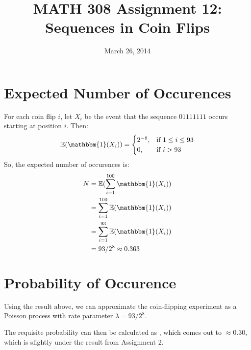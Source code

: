 \documentclass[twocolumn]{article}
\title{MATH 308 Assignment 12:\\Sequences in Coin Flips}
\date{March 26, 2014}
\begin{document}
\maketitle

\section{Expected Number of Occurences}
For each coin flip $i$, let $X_i$ be the event that the sequence $01111111$ occurs starting at position $i$. Then:\[
\ev{\mathbbm{1}(X_i)}=\begin{cases}
	2^{-8},& \text{if } 1 \le i \le 93 \\
	0,& \text{if } i>93
\end{cases}
\]
So, the expected number of occurences is:\begin{align*}
N	&= \ev{\sum_{i=1}^{100} \mathbbm{1}(X_i)}\\
	&= \sum_{i=1}^{100} \ev{\mathbbm{1}(X_i)}\\
	&= \sum_{i=1}^{93} \ev{\mathbbm{1}(X_i)}\\
	&= 93/2^8 \approx 0.363
\end{align*}

\newpage

\section{Probability of Occurence}
Using the result above, we can approximate the coin-flipping experiment as a Poisson process with rate parameter $\lambda=93/2^8$.

The requisite probability can then be calculated as , which comes out to $\approx{0.30}$, which is slightly under the result from Assignment 2.
\end{document}
